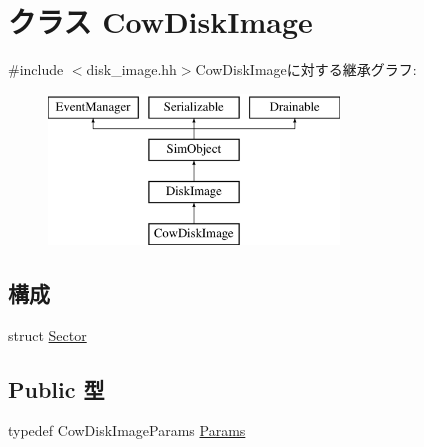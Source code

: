 \hypertarget{classCowDiskImage}{
\section{クラス CowDiskImage}
\label{classCowDiskImage}
}


{\ttfamily \#include $<$disk\_\-image.hh$>$}CowDiskImageに対する継承グラフ:\begin{figure}[H]
\begin{center}
\leavevmode
\includegraphics[height=4cm]{classCowDiskImage}
\end{center}
\end{figure}
\subsection*{構成}
\begin{DoxyCompactItemize}
\item 
struct \hyperlink{structCowDiskImage_1_1Sector}{Sector}
\end{DoxyCompactItemize}
\subsection*{Public 型}
\begin{DoxyCompactItemize}
\item 
typedef CowDiskImageParams \hyperlink{classCowDiskImage_a564df726143da4914743e9d8c1a17c6c}{Params}
\end{DoxyCompactItemize}
